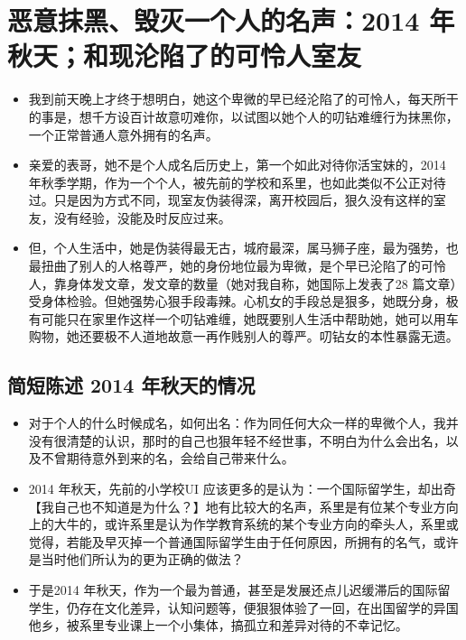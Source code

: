 \documentclass[9pt, b5paper]{article}
\begin{document}
\section{恶意抹黑、毁灭一个人的名声：2014 年秋天；和现沦陷了的可怜人室友}
\label{sec-3}
\begin{itemize}
\item 我到前天晚上才终于想明白，她这个卑微的早已经沦陷了的可怜人，每天所干的事是，想千方设百计故意叨难你，以试图以她个人的叨钻难缠行为抹黑你，一个正常普通人意外拥有的名声。
\item 亲爱的表哥，她不是个人成名后历史上，第一个如此对待你活宝妹的，2014 年秋季学期，作为一个个人，被先前的学校和系里，也如此类似不公正对待过。只是因为方式不同，现室友伪装得深，离开校园后，狠久没有这样的室友，没有经验，没能及时反应过来。
\item 但，个人生活中，她是伪装得最无古，城府最深，属马狮子座，最为强势，也最扭曲了别人的人格尊严，她的身份地位最为卑微，是个早已沦陷了的可怜人，靠身体发文章，发文章的数量（她对我自称，她国际上发表了28 篇文章）受身体检验。但她强势心狠手段毒辣。心机女的手段总是狠多，她既分身，极有可能只在家里作这样一个叨钻难缠，她既要别人生活中帮助她，她可以用车购物，她还要极不人道地故意一再作贱别人的尊严。叨钻女的本性暴露无遗。
\end{itemize}
\subsection{简短陈述 2014 年秋天的情况}
\label{sec-3-1}
\begin{itemize}
\item 对于个人的什么时候成名，如何出名：作为同任何大众一样的卑微个人，我并没有很清楚的认识，那时的自己也狠年轻不经世事，不明白为什么会出名，以及不曾期待意外到来的名，会给自己带来什么。
\item 2014 年秋天，先前的小学校UI 应该更多的是认为：一个国际留学生，却出奇【我自己也不知道是为什么？】地有比较大的名声，系里是有位某个专业方向上的大牛的，或许系里是认为作学教育系统的某个专业方向的牵头人，系里或觉得，若能及早灭掉一个普通国际留学生由于任何原因，所拥有的名气，或许是当时他们所认为的更为正确的做法？
\item 于是2014 年秋天，作为一个最为普通，甚至是发展还点儿迟缓滞后的国际留学生，仍存在文化差异，认知问题等，便狠狠体验了一回，在出国留学的异国他乡，被系里专业课上一个小集体，搞孤立和差异对待的不幸记忆。
\end{itemize}
\end{document}
